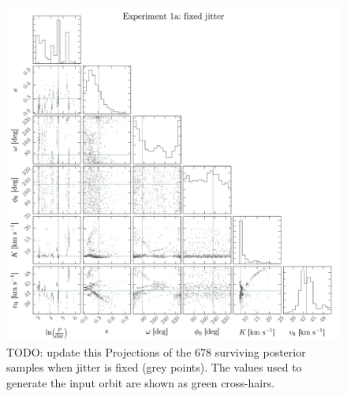 \documentclass[manuscript, letterpaper]{aastex6}
\newcommand{\todo}[1]{{\color{red}TODO: #1}}
\begin{document}
\begin{figure}[p]
\begin{center}
\includegraphics[width=\textwidth]{figures/exp1-corner-a.pdf}
\end{center}
\caption{%
\todo{update this}
Projections of the 678 surviving posterior samples when jitter is fixed (grey
points).
The values used to generate the input orbit are shown as green cross-hairs.
\label{fig:exp1-corner-a}}
\end{figure}
\end{document}
